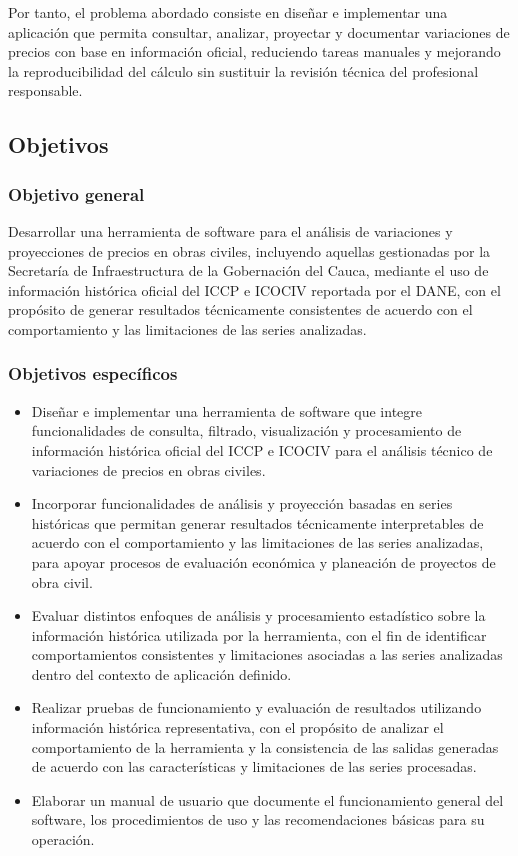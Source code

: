 \documentclass[12pt,letterpaper]{article}
\begin{document}
Por tanto, el problema abordado consiste en diseñar e implementar una aplicación que permita consultar, analizar, proyectar y documentar variaciones de precios con base en información oficial, reduciendo tareas manuales y mejorando la reproducibilidad del cálculo sin sustituir la revisión técnica del profesional responsable.

\subsection{Objetivos}

\subsubsection{Objetivo general}

Desarrollar una herramienta de software para el análisis de variaciones y proyecciones de precios en obras civiles, incluyendo aquellas gestionadas por la Secretaría de Infraestructura de la Gobernación del Cauca, mediante el uso de información histórica oficial del ICCP e ICOCIV reportada por el DANE, con el propósito de generar resultados técnicamente consistentes de acuerdo con el comportamiento y las limitaciones de las series analizadas.

\subsubsection{Objetivos específicos}

\begin{itemize}
    \item Diseñar e implementar una herramienta de software que integre funcionalidades de consulta, filtrado, visualización y procesamiento de información histórica oficial del ICCP e ICOCIV para el análisis técnico de variaciones de precios en obras civiles.
    \item Incorporar funcionalidades de análisis y proyección basadas en series históricas que permitan generar resultados técnicamente interpretables de acuerdo con el comportamiento y las limitaciones de las series analizadas, para apoyar procesos de evaluación económica y planeación de proyectos de obra civil.
    \item Evaluar distintos enfoques de análisis y procesamiento estadístico sobre la información histórica utilizada por la herramienta, con el fin de identificar comportamientos consistentes y limitaciones asociadas a las series analizadas dentro del contexto de aplicación definido.
    \item Realizar pruebas de funcionamiento y evaluación de resultados utilizando información histórica representativa, con el propósito de analizar el comportamiento de la herramienta y la consistencia de las salidas generadas de acuerdo con las características y limitaciones de las series procesadas.
    \item Elaborar un manual de usuario que documente el funcionamiento general del software, los procedimientos de uso y las recomendaciones básicas para su operación.
\end{itemize}
\end{document}
